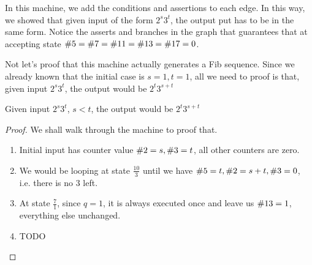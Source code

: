 In this machine, we add the conditions and assertions to each edge.
In this way, we showed that given input of the form $2^s3^t$, the output put has to be in the same form.
Notice the asserts and branches in the graph that guarantees that at accepting state $\V = \VII = \XI = \XII = \XVII = 0$.

Not let's proof that this machine actually generates a Fib sequence.
Since we already known that the initial case is $s = 1, t = 1$, all we need to proof is that, given input $2^s3^t$, the output would be $2^t3^{s+t}$

\begin{theorem}
    Given input $2^s3^t$, $s < t$, the output would be $2^t3^{s+t}$
\end{theorem}

\begin{proof}

    We shall walk through the machine to proof that.
    \begin{enumerate}
        \item Initial input has counter value $\II = s, \III = t$, all other counters are zero.
        \item We would be looping at state $\frac{10}{3}$ until we have $\V = t, \II = s + t, \III = 0$, i.e. there is no $3$ left. 
        \item At state $\frac{7}{1}$, since $q = 1$, it is always executed once and leave us $\XII = 1$, everything else unchanged.
        \item TODO
    \end{enumerate}
\end{proof}


